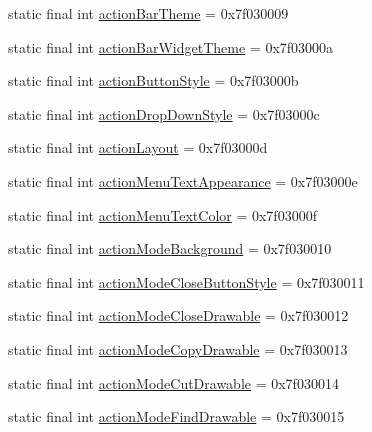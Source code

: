 \begin{DoxyCompactItemize}
static final int \mbox{\hyperlink{classcom_1_1synnapps_1_1carouselview_1_1_r_1_1attr_a97a0b13eaefae45921e738e4e0ef819b}{action\+Bar\+Theme}} = 0x7f030009
\item 
static final int \mbox{\hyperlink{classcom_1_1synnapps_1_1carouselview_1_1_r_1_1attr_a50f1ebe8a57b2155447b5b967d677b6e}{action\+Bar\+Widget\+Theme}} = 0x7f03000a
\item 
static final int \mbox{\hyperlink{classcom_1_1synnapps_1_1carouselview_1_1_r_1_1attr_ab303416c8099e2d45b673eb5615f72cd}{action\+Button\+Style}} = 0x7f03000b
\item 
static final int \mbox{\hyperlink{classcom_1_1synnapps_1_1carouselview_1_1_r_1_1attr_a18c6266824baf786150722a7d9c075cf}{action\+Drop\+Down\+Style}} = 0x7f03000c
\item 
static final int \mbox{\hyperlink{classcom_1_1synnapps_1_1carouselview_1_1_r_1_1attr_ac73c0e04d84a020ce0cfe734159a8884}{action\+Layout}} = 0x7f03000d
\item 
static final int \mbox{\hyperlink{classcom_1_1synnapps_1_1carouselview_1_1_r_1_1attr_aa16a796fd264b40b224d28a6339f3215}{action\+Menu\+Text\+Appearance}} = 0x7f03000e
\item 
static final int \mbox{\hyperlink{classcom_1_1synnapps_1_1carouselview_1_1_r_1_1attr_a4283d4d39a9227b2fbee71bb2847252a}{action\+Menu\+Text\+Color}} = 0x7f03000f
\item 
static final int \mbox{\hyperlink{classcom_1_1synnapps_1_1carouselview_1_1_r_1_1attr_ac4ad3825115e697fd1f539a4350a3cc9}{action\+Mode\+Background}} = 0x7f030010
\item 
static final int \mbox{\hyperlink{classcom_1_1synnapps_1_1carouselview_1_1_r_1_1attr_a431daf08740c1666e52cd19ae33687f0}{action\+Mode\+Close\+Button\+Style}} = 0x7f030011
\item 
static final int \mbox{\hyperlink{classcom_1_1synnapps_1_1carouselview_1_1_r_1_1attr_adcf80f921d7553fd9fcd9dfd12cc3498}{action\+Mode\+Close\+Drawable}} = 0x7f030012
\item 
static final int \mbox{\hyperlink{classcom_1_1synnapps_1_1carouselview_1_1_r_1_1attr_a9298a0c1790f2ea18d008a404823e66c}{action\+Mode\+Copy\+Drawable}} = 0x7f030013
\item 
static final int \mbox{\hyperlink{classcom_1_1synnapps_1_1carouselview_1_1_r_1_1attr_a50faae9fbdba911c6e571203ad89e9d0}{action\+Mode\+Cut\+Drawable}} = 0x7f030014
\item 
static final int \mbox{\hyperlink{classcom_1_1synnapps_1_1carouselview_1_1_r_1_1attr_a76e48a394209f078e4a058490beed76d}{action\+Mode\+Find\+Drawable}} = 0x7f030015

\end{DoxyCompactItemize}
